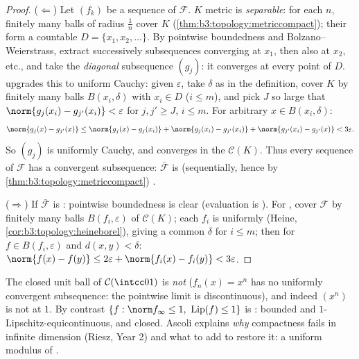 \begin{proof}
($\Leftarrow$) Let $(f_k)$ be a sequence of $\mathcal F$. $K$
 metric is \emph{separable}: for each $n$, finitely many
balls of radius $\frac1n$ cover $K$
(\cref{thm:b3:topology:metriccompact}); their  form a
countable  $D = \{x_1, x_2, \dots\}$. By pointwise
boundedness and Bolzano--Weierstrass, extract successively
subsequences converging at $x_1$, then also at $x_2$, etc., and
take the \emph{diagonal} subsequence $(g_j)$: it converges at
every point of $D$.  upgrades this to uniform
Cauchy: given $\varepsilon$, take $\delta$ as in the
definition, cover $K$ by finitely many balls $B(x_i, \delta)$
with $x_i \in D$ ($i \leq m$), and pick $J$ so large that
$\norm{g_j(x_i) - g_{j'}(x_i)} < \varepsilon$ for $j, j' \geq
J$, $i \leq m$. For arbitrary $x \in B(x_i, \delta)$:
\[
\norm{g_j(x) - g_{j'}(x)}
\leq \norm{g_j(x) - g_j(x_i)} + \norm{g_j(x_i) - g_{j'}(x_i)}
+ \norm{g_{j'}(x_i) - g_{j'}(x)} < 3\varepsilon .
\]
So $(g_j)$ is uniformly Cauchy, and converges in the 
$\mathcal C(K)$. Thus every sequence of $\mathcal F$ has a
convergent subsequence: $\bar{\mathcal F}$ is (sequentially,
hence by \cref{thm:b3:topology:metriccompact}) .

($\Rightarrow$) If $\bar{\mathcal F}$ is : pointwise
boundedness is clear (evaluation is ). For
, cover $\mathcal F$ by finitely many balls
$B(f_i, \varepsilon)$ of $\mathcal C(K)$; each $f_i$ is
uniformly  (Heine,
\cref{cor:b3:topology:heineborel}), giving a common $\delta$
for $i \leq m$; then for $f \in B(f_i, \varepsilon)$ and $d(x,y)
< \delta$: $\norm{f(x)-f(y)} \leq 2\varepsilon +
\norm{f_i(x)-f_i(y)} < 3\varepsilon$.
\end{proof}

\begin{example}\label{ex:b3:complete:ascoliexamples}
The closed unit ball of $\mathcal C(\intcc01)$ is \emph{not}
 ($f_n(x) = x^n$ has no uniformly convergent
subsequence: the pointwise limit is discontinuous), and indeed
$(x^n)$ is not  at $1$. By contrast $\{f : \norm
f_\infty \leq 1,\ \operatorname{Lip}(f) \leq 1\}$ is :
bounded and $1$-Lipschitz-equicontinuous, and closed. Ascoli
explains \emph{why} compactness fails in infinite dimension
(Riesz, Year 2) and what to add to restore it: a uniform
modulus of .
\end{example}

